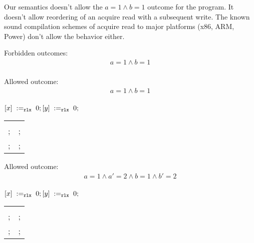 Our semantics doesn't allow the $a = 1 \land b = 1$ outcome for the program.
It doesn't allow reordering of an acquire read with a subsequent write.
The known sound compilation schemes of acquire read to major platforms (x86, ARM, Power) don't
allow the behavior either. 

\litmusTestEnd

\begin{minipage}[t]{0.3\linewidth}
Forbidden outcomes:\\
\[\begin{array}{l}
a = 1 \land b = 1\\
\end{array}\]
\end{minipage}
%
\lbTemplate{\rlx}{\rlx}{\acq}{\rlx}{\rlx}{\rel}
\litmusTestEnd

\begin{minipage}[t]{0.3\linewidth}
Allowed outcome:\\
\[\begin{array}{l}
a = 1 \land b = 1\\
\end{array}\]
\end{minipage}
%
\codePrefix
  $[x] \;:=_{\mathtt{rlx}}\;0; [y] \;:=_{\mathtt{rlx}}\;0;$ \\
\begin{tabular}{L || L}
   &  \\
  ; & ; \\
  ; & ; \\
\end{tabular}
\codePostfix

\litmusTestEnd

\begin{minipage}[t]{0.3\linewidth}
Allowed outcome:\\
\[\begin{array}{l}
a = 1 \land a' = 2 \land b = 1 \land b' = 2 \\
\end{array}\]
\end{minipage}
%
\codePrefix
  $[x] \;:=_{\mathtt{rlx}}\;0; [y] \;:=_{\mathtt{rlx}}\;0;$ \\
\begin{tabular}{L || L}
   &  \\
  ; & ; \\
  ; & ; \\
\end{tabular}
\codePostfix

